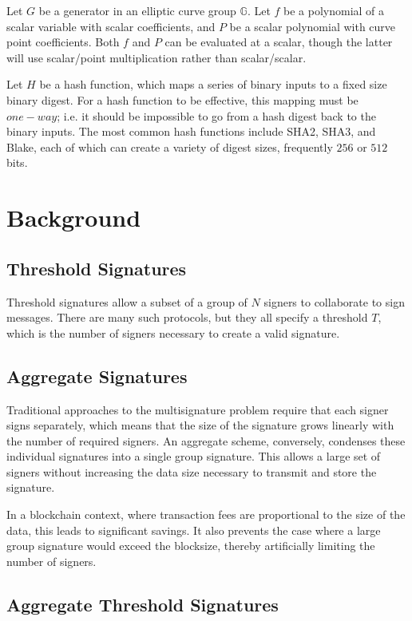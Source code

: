 \documentclass{article}
\theoremstyle{definition}
\theoremstyle{remark}
\begin{document}
Let $G$ be a generator in an elliptic curve group $\mathbb{G}$.  Let $f$ be a polynomial of a scalar variable with scalar coefficients, and $P$ be a scalar polynomial with curve point coefficients.  Both $f$ and $P$ can be evaluated at a scalar, though the latter will use scalar/point multiplication rather than scalar/scalar.

Let $H$ be a hash function, which maps a series of binary inputs to a fixed size binary digest.  For a hash function to be effective, this mapping must be $one-way$; i.e. it should be impossible to go from a hash digest back to the binary inputs.  The most common hash functions include SHA2, SHA3, and Blake, each of which can create a variety of digest sizes, frequently $256$ or $512$ bits.

\newpage
\onecolumn
\section{
  Background
}

\subsection{
  Threshold Signatures
}

Threshold signatures allow a subset of a group of $N$ signers to collaborate to sign messages.  There are many such protocols, but they all specify a threshold $T$, which is the number of signers necessary to create a valid signature.  

\subsection{
  Aggregate Signatures
}

Traditional approaches to the multisignature problem require that each signer signs separately, which means that the size of the signature grows linearly with the number of required signers.  An aggregate scheme, conversely, condenses these individual signatures into a single group signature.  This allows a large set of signers without increasing the data size necessary to transmit and store the signature.

In a blockchain context, where transaction fees are proportional to the size of the data, this leads to significant savings.  It also prevents the case where a large group signature would exceed the blocksize, thereby artificially limiting the number of signers.

\subsection{
  Aggregate Threshold Signatures
}
\end{document}
